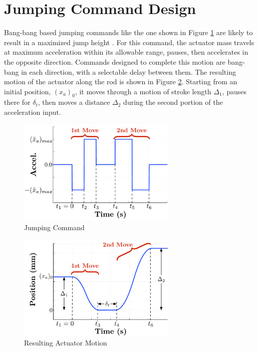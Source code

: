 \documentclass[10pt,twocolumn,letterpaper]{article}
\begin{document}
% 
        
\section{Jumping Command Design}
\label{sec:control_input_exp}

Bang-bang based jumping commands like the one shown in Figure \ref{fig:sim_command} are likely to result in a maximized jump height \cite{Vaughan2013}. For this command, the actuator mass travels at maximum acceleration within its allowable range, pauses, then accelerates in the opposite direction. Commands designed to complete this motion are bang-bang in each direction, with a selectable delay between them. The resulting motion of the actuator along the rod is shown in Figure \ref{fig:command_act_motion}. Starting from an initial position, $(x_a)_0$, it moves through a motion of stroke length $\Delta_1$, pauses there for $\delta_t$, then moves a distance $\Delta_2$ during the second portion of the acceleration input.

%
\begin{figure}[tb]
\begin{center}
\includegraphics[width = 3in]{figures/input_shaping/Command_form.pdf}  
\caption{Jumping Command}
\label{fig:sim_command}
\end{center}
\end{figure}
%
%
\begin{figure}[tb]
\begin{center}
\includegraphics[width = 3in]{figures/input_shaping/Jumping_command_position.pdf}  
\caption{Resulting Actuator Motion}
\label{fig:command_act_motion}
\end{center}
\end{figure}
%
\end{document}
